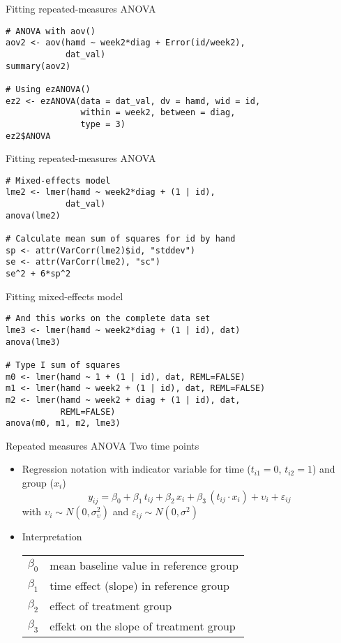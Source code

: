 \documentclass{beamer}
\begin{document}
{

\begin{frame}[fragile]{Fitting repeated-measures ANOVA}
  \begin{lstlisting}
# ANOVA with aov()
aov2 <- aov(hamd ~ week2*diag + Error(id/week2),
            dat_val)
summary(aov2)

# Using ezANOVA()
ez2 <- ezANOVA(data = dat_val, dv = hamd, wid = id,
               within = week2, between = diag,
               type = 3)
ez2$ANOVA
  \end{lstlisting}
\end{frame}

\begin{frame}[fragile]{Fitting repeated-measures ANOVA}
  \begin{lstlisting}
# Mixed-effects model
lme2 <- lmer(hamd ~ week2*diag + (1 | id),
            dat_val)
anova(lme2)

# Calculate mean sum of squares for id by hand
sp <- attr(VarCorr(lme2)$id, "stddev")
se <- attr(VarCorr(lme2), "sc")
se^2 + 6*sp^2
  \end{lstlisting}
\end{frame}

\begin{frame}[fragile]{Fitting mixed-effects model}
  \begin{lstlisting}
# And this works on the complete data set
lme3 <- lmer(hamd ~ week2*diag + (1 | id), dat)
anova(lme3)

# Type I sum of squares
m0 <- lmer(hamd ~ 1 + (1 | id), dat, REML=FALSE)
m1 <- lmer(hamd ~ week2 + (1 | id), dat, REML=FALSE)
m2 <- lmer(hamd ~ week2 + diag + (1 | id), dat,
           REML=FALSE)
anova(m0, m1, m2, lme3)
  \end{lstlisting}
\end{frame}

}

\begin{frame}{Repeated measures ANOVA}
  {Two time points}
\begin{itemize}
  \item Regression notation with indicator variable for time ($t_{i1} = 0$,
    $t_{i2} = 1$) and group ($x_i$)
    \[
      y_{ij} = \beta_0 + \beta_1 \, t_{ij} + \beta_2 \, x_i +
               \beta_3 \, (t_{ij} \cdot x_i) + \upsilon_i + \varepsilon_{ij}
    \]
    with $\upsilon_i \sim N(0, \sigma^2_\upsilon)$ and $\varepsilon_{ij}
    \sim N(0, \sigma^2)$
  \item Interpretation
    \begin{center}
    \begin{tabular}{lp{10cm}}
    $\beta_0$ & mean baseline value in reference group\\
    $\beta_1$ & time effect (slope) in reference group\\
    $\beta_2$ & effect of treatment group\\
    $\beta_3$ & effekt on the slope of treatment group
    \end{tabular}
    \end{center}
\end{itemize}
\end{frame}
\end{document}
